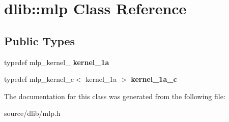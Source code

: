 \hypertarget{classdlib_1_1mlp}{
\section{dlib::mlp Class Reference}
\label{classdlib_1_1mlp}
}
\subsection*{Public Types}
\begin{DoxyCompactItemize}
\item 
\hypertarget{classdlib_1_1mlp_a952a66310fdcedd417f809d8e3c66ee9}{
typedef mlp\_\-kernel\_ {\bfseries kernel\_\-1a}}
\label{classdlib_1_1mlp_a952a66310fdcedd417f809d8e3c66ee9}

\item 
\hypertarget{classdlib_1_1mlp_a3baf5bc729c82b4d448a90e4e33a58b9}{
typedef mlp\_\-kernel\_\-c$<$ kernel\_\-1a $>$ {\bfseries kernel\_\-1a\_\-c}}
\label{classdlib_1_1mlp_a3baf5bc729c82b4d448a90e4e33a58b9}

\end{DoxyCompactItemize}


The documentation for this class was generated from the following file:\begin{DoxyCompactItemize}
\item 
source/dlib/mlp.h\end{DoxyCompactItemize}
